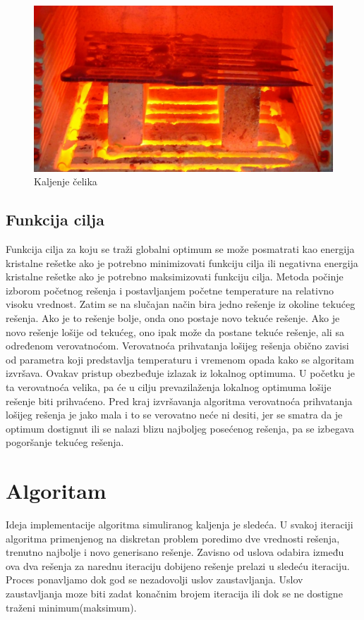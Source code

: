 \documentclass[a4paper]{article}
\begin{document}
\begin{figure}[h!]
\centering
\includegraphics[scale=0.3]{kal.jpg}
\caption{Kaljenje čelika}
\label{fig:universe}
\end{figure}
\subsection{Funkcija cilja}
Funkcija cilja za koju se traži globalni optimum se može posmatrati kao energija kristalne rešetke ako je potrebno minimizovati funkciju cilja ili negativna energija kristalne rešetke ako
je potrebno maksimizovati funkciju cilja. Metoda počinje izborom početnog rešenja i postavljanjem početne temperature na relativno visoku vrednost. Zatim se na slučajan način bira
jedno rešenje iz okoline tekućeg rešenja. Ako je to rešenje bolje, onda ono postaje novo tekuće rešenje. Ako je novo rešenje lošije od tekućeg, ono ipak može da postane tekuće rešenje, ali
sa određenom verovatnoćom. Verovatnoća prihvatanja lošijeg rešenja obično zavisi od parametra koji predstavlja temperaturu i vremenom opada kako se algoritam izvršava. Ovakav pristup obezbeđuje izlazak iz lokalnog optimuma. U početku je ta verovatnoća velika, pa će
u cilju prevazilaženja lokalnog optimuma lošije rešenje biti prihvaćeno. Pred kraj izvršavanja
algoritma verovatnoća prihvatanja lošijeg rešenja je jako mala i to se verovatno neće ni desiti,
jer se smatra da je optimum dostignut ili se nalazi blizu najboljeg posećenog rešenja, pa se
izbegava pogoršanje tekućeg rešenja.


\section{Algoritam}
Ideja implementacije algoritma\cite{sannealingbook} simuliranog kaljenja je sledeća. U svakoj iteraciji algoritma primenjenog na diskretan problem poredimo dve vrednosti rešenja, trenutno najbolje i novo generisano rešenje. Zavisno od uslova odabira između ova dva rešenja za narednu iteraciju dobijeno rešenje prelazi u sledeću iteraciju. Proces ponavljamo  dok god se nezadovolji uslov zaustavljanja. Uslov zaustavljanja moze biti zadat konačnim brojem iteracija ili dok se ne dostigne traženi minimum(maksimum).
\end{document}
